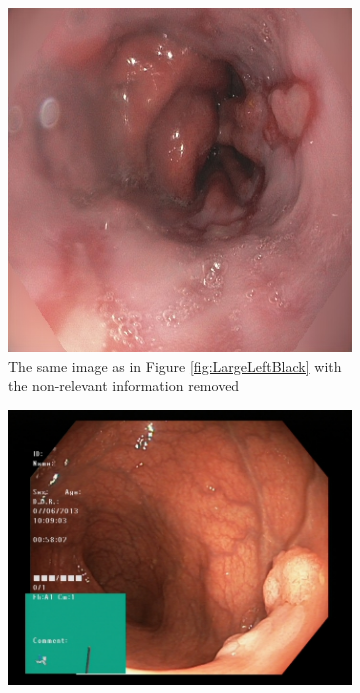 \begin{figure}
\begin{subfigure}[t]{0.4\textwidth}
         \includegraphics[height=\textwidth, width=\textwidth]{experiments/figures/noleftframe.jpg}
         \caption{The same image as in Figure \ref{fig:LargeLeftBlack} with the non-relevant information removed}
         \label{fig:LargeLeftBlackFIX}
     \end{subfigure}
     \hfill
     \begin{subfigure}[t]{0.4\textwidth}
         \centering
         \includegraphics[height=\textwidth, width=\textwidth]{experiments/figures/greenframe.jpg}

\end{subfigure}
\end{figure}
